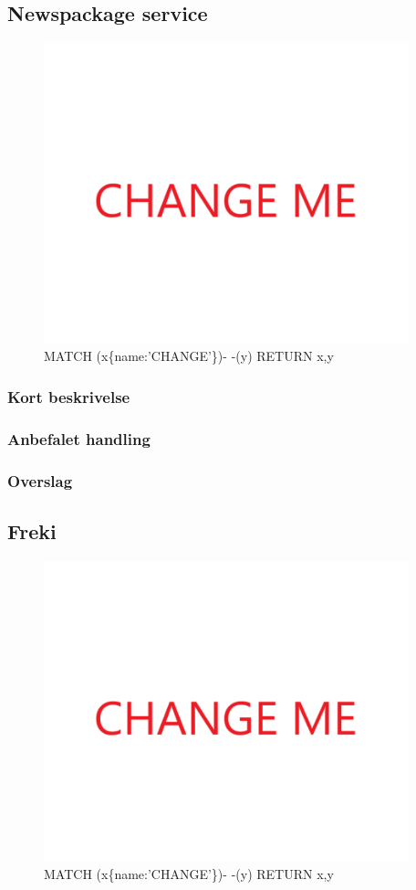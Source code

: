 \documentclass{article}
\begin{document}
\subsection{Newspackage service}
\begin{figure}[h]
\includegraphics[width=300pt]{CHANGE.PNG}
\caption{MATCH (x\{name:'CHANGE'\})- -(y) RETURN x,y}
\end{figure}
\subsubsection{Kort beskrivelse}
\subsubsection{Anbefalet handling}
\subsubsection{Overslag}
\subsection{Freki}
\begin{figure}[h]
\includegraphics[width=300pt]{CHANGE.PNG}
\caption{MATCH (x\{name:'CHANGE'\})- -(y) RETURN x,y}
\end{figure}
\end{document}
